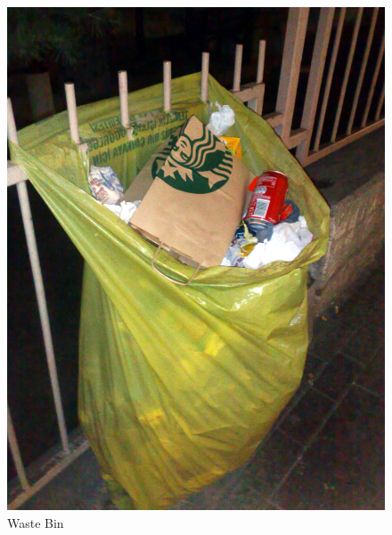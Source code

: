 \begin{figure}[!tbp]
  \centering
  \begin{minipage}[b]{0.48\textwidth}
    \includegraphics[width=\textwidth]{project_graphics/collected_from.jpg}
    \caption{Waste Bin}
    \label{fig:CardBoard}
  \end{minipage}
  \hfill
  \begin{minipage}[b]{0.48\textwidth}

\end{minipage}
\end{figure}
